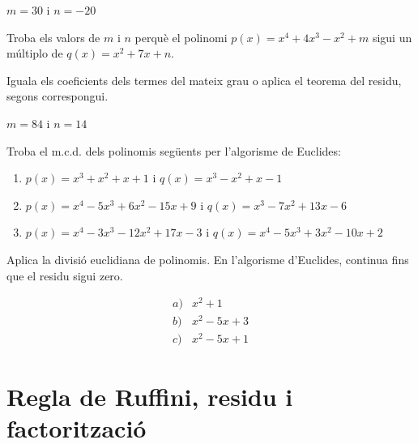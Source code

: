 \begin{solucio}
$m=30$ i $n=-20$
\end{solucio}

\begin{exercici}
Troba els valors de $m$ i $n$ perquè el polinomi $
p(x)=x^{4}+4x^{3}-x^{2}+m$ sigui un múltiplo de $q(x)=x^{2}+7x+n$.
\end{exercici}
\begin{indicacio}
Iguala els coeficients dels termes del mateix grau o aplica el teorema del residu, segons correspongui.
\end{indicacio}

\begin{solucio}
$m=84$ i $n=14$
\end{solucio}

\begin{exercici}
Troba el m.c.d. dels polinomis següents per l'algorisme de
Euclides:

\begin{enumerate}
\item[a)] $p(x)=x^{3}+x^{2}+x+1$ i $q(x)=x^{3}-x^{2}+x-1$

\item[b)] $p(x)=x^{4}-5x^{3}+6x^{2}-15x+9$ i $q(x)=x^{3}-7x^{2}+13x-6$

\item[c)] $p(x)=x^{4}-3x^{3}-12x^{2}+17x-3$ i $
q(x)=x^{4}-5x^{3}+3x^{2}-10x+2 $
\end{enumerate}
\end{exercici}
\begin{indicacio}
Aplica la divisió euclidiana de polinomis. En l’algorisme d’Euclides, continua fins que el residu sigui zero.
\end{indicacio}

\begin{solucio}
\[
\begin{array}{ll}
a) & x^{2}+1 \\
b) & x^{2}-5x+3 \\
c) & x^{2}-5x+1
\end{array}
\]
\end{solucio}

\section{Regla de Ruffini, residu i factorització}

